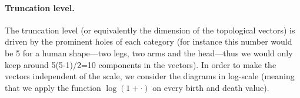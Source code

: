

\paragraph*{Truncation level.}
The truncation level (or equivalently the dimension of the topological vectors) is driven by the prominent holes of each category
(for instance this number would be 5 for a human shape---two legs, two arms and the head---thus we would 
only keep around 5(5-1)/2=10 components in the vectors).
In order to make the vectors independent of the scale, we
consider the diagrams in log-scale (meaning that we apply the function $\log(1+\cdot)$ 
on every birth and death value). 


